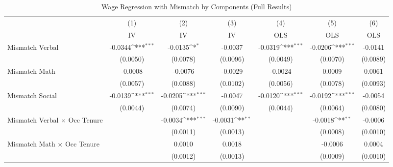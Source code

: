 {
\def\sym#1{\ifmmode^{#1}\else\(^{#1}\)\fi}
\begin{longtable}{l*{6}{c}}
\caption{Wage Regression with Mismatch by Components (Full Results)}\\
\hline  \endfirsthead\hline  \endhead\hline  \endfoot\endlastfoot
                    &\multicolumn{1}{c}{(1)}&\multicolumn{1}{c}{(2)}&\multicolumn{1}{c}{(3)}&\multicolumn{1}{c}{(4)}&\multicolumn{1}{c}{(5)}&\multicolumn{1}{c}{(6)}\\
                    &\multicolumn{1}{c}{IV}&\multicolumn{1}{c}{IV}&\multicolumn{1}{c}{IV}&\multicolumn{1}{c}{OLS}&\multicolumn{1}{c}{OLS}&\multicolumn{1}{c}{OLS}\\
\hline  
Mismatch Verbal     &     -0.0344\sym{***}&     -0.0135\sym{*}  &     -0.0037         &     -0.0319\sym{***}&     -0.0206\sym{***}&     -0.0141         \\
                    &    (0.0050)         &    (0.0078)         &    (0.0096)         &    (0.0049)         &    (0.0070)         &    (0.0089)         \\
Mismatch Math       &     -0.0008         &     -0.0076         &     -0.0029         &     -0.0024         &      0.0009         &      0.0061         \\
                    &    (0.0057)         &    (0.0088)         &    (0.0102)         &    (0.0056)         &    (0.0078)         &    (0.0093)         \\
Mismatch Social     &     -0.0139\sym{***}&     -0.0205\sym{***}&     -0.0047         &     -0.0120\sym{***}&     -0.0192\sym{***}&     -0.0054         \\
                    &    (0.0044)         &    (0.0074)         &    (0.0090)         &    (0.0044)         &    (0.0064)         &    (0.0080)         \\
Mismatch Verbal $\times$ Occ Tenure&                     &     -0.0034\sym{***}&     -0.0031\sym{**} &                     &     -0.0018\sym{**} &     -0.0006         \\
                    &                     &    (0.0011)         &    (0.0013)         &                     &    (0.0008)         &    (0.0010)         \\
Mismatch Math $\times$ Occ Tenure&                     &      0.0010         &      0.0018         &                     &     -0.0006         &      0.0004         \\
                    &                     &    (0.0012)         &    (0.0013)         &                     &    (0.0009)         &    (0.0010)         \\

\end{longtable}}
